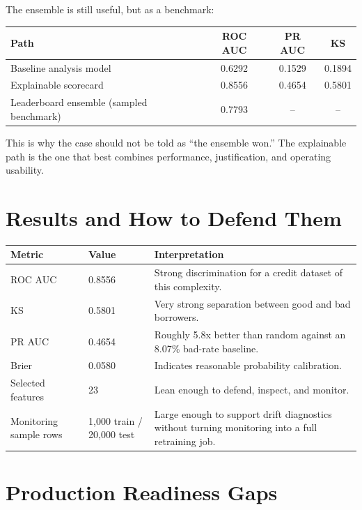 \documentclass[11pt]{article}
\begin{document}
The ensemble is still useful, but as a benchmark:

\begin{center}
{\small
\begin{tabularx}{0.78\textwidth}{@{}Yccc@{}}
\toprule
Path & ROC AUC & PR AUC & KS \\
\midrule
Baseline analysis model & 0.6292 & 0.1529 & 0.1894 \\
Explainable scorecard & 0.8556 & 0.4654 & 0.5801 \\
Leaderboard ensemble (sampled benchmark) & 0.7793 & -- & -- \\
\bottomrule
\end{tabularx}
}
\end{center}

This is why the case should not be told as ``the ensemble won.'' The explainable path is the one that best combines performance, justification, and operating usability.

\section{Results and How to Defend Them}

\begin{tabularx}{\textwidth}{@{}P{0.18\textwidth}P{0.16\textwidth}Y@{}}
\toprule
Metric & Value & Interpretation \\
\midrule
ROC AUC & 0.8556 & Strong discrimination for a credit dataset of this complexity. \\
KS & 0.5801 & Very strong separation between good and bad borrowers. \\
PR AUC & 0.4654 & Roughly 5.8x better than random against an 8.07\% bad-rate baseline. \\
Brier & 0.0580 & Indicates reasonable probability calibration. \\
Selected features & 23 & Lean enough to defend, inspect, and monitor. \\
Monitoring sample rows & 1{,}000 train / 20{,}000 test & Large enough to support drift diagnostics without turning monitoring into a full retraining job. \\
\bottomrule
\end{tabularx}

\section{Production Readiness Gaps}
\end{document}
